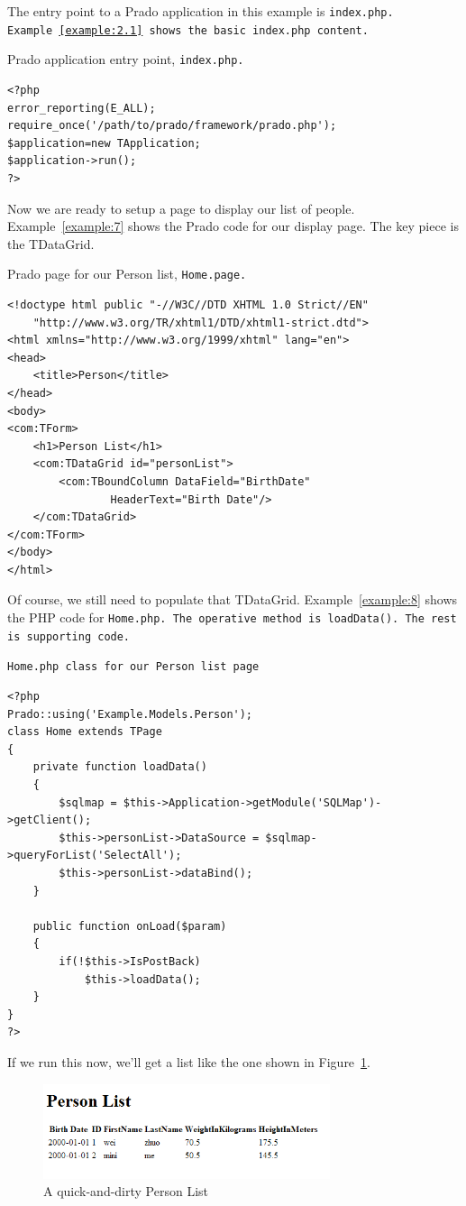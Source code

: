 The entry point to a Prado application in this example is \tt{index.php}.
Example~\ref{example:2.1} shows the basic \tt{index.php} content.
\begin{example}\label{example:2.1}
Prado application entry point, \tt{index.php}.
\begin{verbatim}
<?php
error_reporting(E_ALL);
require_once('/path/to/prado/framework/prado.php');
$application=new TApplication;
$application->run();
?>
\end{verbatim}
\end{example}

Now we are ready to setup a page to display our list of people.
Example~\ref{example:7} shows the Prado code for our display page. The key
piece is the TDataGrid.

\begin{example}\label{example:7}
Prado page for our Person list, \tt{Home.page}.
\begin{verbatim}
<!doctype html public "-//W3C//DTD XHTML 1.0 Strict//EN"
    "http://www.w3.org/TR/xhtml1/DTD/xhtml1-strict.dtd">
<html xmlns="http://www.w3.org/1999/xhtml" lang="en">
<head>
    <title>Person</title>
</head>
<body>
<com:TForm>
    <h1>Person List</h1>
    <com:TDataGrid id="personList">
        <com:TBoundColumn DataField="BirthDate"
                HeaderText="Birth Date"/>
    </com:TDataGrid>
</com:TForm>
</body>
</html>
\end{verbatim}
\end{example}

Of course, we still need to populate that TDataGrid. Example~\ref{example:8}
shows the PHP code for \tt{Home.php}. The operative method is \tt{loadData()}.
The rest is supporting code.

\begin{example}\label{example:8}
\tt{Home.php} class for our Person list page
\begin{verbatim}
<?php
Prado::using('Example.Models.Person');
class Home extends TPage
{
    private function loadData()
    {
        $sqlmap = $this->Application->getModule('SQLMap')->getClient();
        $this->personList->DataSource = $sqlmap->queryForList('SelectAll');
        $this->personList->dataBind();
    }

    public function onLoad($param)
    {
        if(!$this->IsPostBack)
            $this->loadData();
    }
}
?>
\end{verbatim}
\end{example}

If we run this now, we'll get a list like the one shown in
Figure~\ref{figure:2}.
\begin{figure}[!h]
    \centering
        \includegraphics[width=0.75\textwidth]{grid1}
    \caption{A quick-and-dirty Person List}
    \label{figure:2}
\end{figure}
